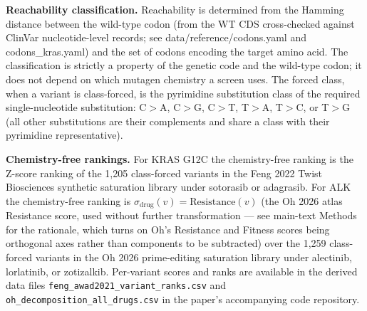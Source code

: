 \documentclass[10pt,a4paper,landscape]{article}
\begin{document}
\vspace{4pt}

\noindent\textbf{Reachability classification.} Reachability is determined from the Hamming distance between the wild-type codon (from the WT CDS cross-checked against ClinVar nucleotide-level records; see data/reference/codons.yaml and codons\_kras.yaml) and the set of codons encoding the target amino acid. The classification is strictly a property of the genetic code and the wild-type codon; it does not depend on which mutagen chemistry a screen uses. The forced class, when a variant is class-forced, is the pyrimidine substitution class of the required single-nucleotide substitution: C$>$A, C$>$G, C$>$T, T$>$A, T$>$C, or T$>$G (all other substitutions are their complements and share a class with their pyrimidine representative).

\vspace{4pt}

\noindent\textbf{Chemistry-free rankings.} For KRAS G12C the chemistry-free ranking is the Z-score ranking of the 1,205 class-forced variants in the Feng 2022 Twist Biosciences synthetic saturation library under sotorasib or adagrasib. For ALK the chemistry-free ranking is $\sigma_{\mathrm{drug}}(v) = \text{Resistance}(v)$ (the Oh 2026 atlas Resistance score, used without further transformation --- see main-text Methods for the rationale, which turns on Oh's Resistance and Fitness scores being orthogonal axes rather than components to be subtracted) over the 1,259 class-forced variants in the Oh 2026 prime-editing saturation library under alectinib, lorlatinib, or zotizalkib. Per-variant scores and ranks are available in the derived data files \texttt{feng\_awad2021\_variant\_ranks.csv} and \texttt{oh\_decomposition\_all\_drugs.csv} in the paper's accompanying code repository.

\vspace{4pt}
\end{document}
